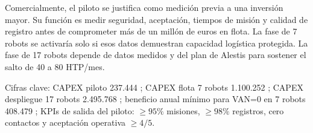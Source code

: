 Comercialmente, el piloto se justifica como medición previa a una inversión mayor. Su función es medir seguridad, aceptación, tiempos de misión y calidad de registro antes de comprometer más de un millón de euros en flota. La fase de 7 robots se activaría solo si esos datos demuestran capacidad logística protegida. La fase de 17 robots depende de datos medidos y del plan de Alestis para sostener el salto de 40 a 80 HTP/mes.

\begin{summarybox}
Cifras clave: CAPEX piloto 237.444 \texteuro{}; CAPEX flota 7 robots 1.100.252 \texteuro{}; CAPEX despliegue 17 robots 2.495.768 \texteuro{}; beneficio anual mínimo para VAN=0 en 7 robots 408.479 \texteuro{}; KPIs de salida del piloto: \(\geq 95\%\) misiones, \(\geq 98\%\) registros, cero contactos y aceptación operativa \(\geq 4/5\).
\end{summarybox}
